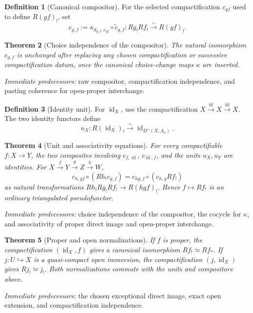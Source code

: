 \documentclass[10pt]{article}
\newtheorem{theorem}{Theorem}[section]
\theoremstyle{definition}
\newtheorem{definition}[theorem]{Definition}
\newcommand{\pred}[1]{\par\smallskip\begingroup\footnotesize\raggedright
\emph{Immediate predecessors:} #1.\par\endgroup}
\begin{document}
\begin{definition}[Canonical compositor]
For the selected compactification \(c_{gf}\) used to define \(R(gf)_!\), set
\[
 c_{g,f}:=
 \kappa_{d_{g,f},c_{gf}}\circ\widetilde c_{g,f}:
 Rg_!Rf_!\xrightarrow{\sim}R(gf)_!.
\]
\end{definition}

\begin{theorem}[Choice independence of the compositor]
The natural isomorphism \(c_{g,f}\) is unchanged after replacing any chosen
compactification or successive compactification datum, once the canonical
choice-change maps \(\kappa\) are inserted.
\end{theorem}
\pred{raw compositor, compactification independence, and pasting coherence for open-proper interchange}

\begin{definition}[Identity unit]
For \(\operatorname{id}_X\), use the compactification
\(X\xrightarrow{\operatorname{id}}X\xrightarrow{\operatorname{id}}X\).
The two identity functors define
\[
 u_X:R(\operatorname{id}_X)_!\xrightarrow{\sim}
 \operatorname{id}_{D^+(X,\Lambda_n)}.
\]
\end{definition}

\begin{theorem}[Unit and associativity equations]
For every compactifiable \(f:X\to Y\), the two composites involving
\(c_{f,\operatorname{id}}\), \(c_{\operatorname{id},f}\), and the units
\(u_X,u_Y\) are identities.  For
\(X\xrightarrow{f}Y\xrightarrow{g}Z\xrightarrow{h}W\),
\[
 c_{h,gf}\circ(Rh_!c_{g,f})
 =c_{hg,f}\circ(c_{h,g}Rf_!)
\]
as natural transformations \(Rh_!Rg_!Rf_!\to R(hgf)_!\).  Hence
\(f\mapsto Rf_!\) is an ordinary triangulated pseudofunctor.
\end{theorem}
\pred{choice independence of the compositor, the cocycle for \(\kappa\), and associativity of proper direct image and open-proper interchange}

\begin{theorem}[Proper and open normalizations]
If \(f\) is proper, the compactification \((\operatorname{id}_X,f)\) gives
a canonical isomorphism \(Rf_!\simeq Rf_*\).  If \(j:U\hookrightarrow X\)
is a quasi-compact open immersion, the compactification
\((j,\operatorname{id}_X)\) gives \(Rj_!\simeq j_!\).  Both normalizations
commute with the units and compositors above.
\end{theorem}
\pred{the chosen exceptional direct image, exact open extension, and compactification independence}
\end{document}
